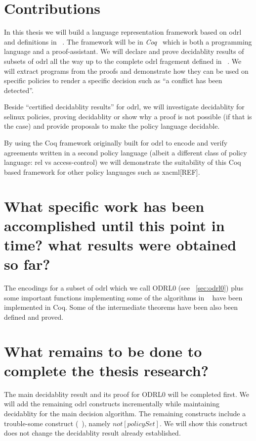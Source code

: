 \section{Contributions}

In this thesis we will build a language representation framework based on \ac{odrl} and definitions in ~\cite{pucella2006}. The framework will be in \emph{Coq}~\cite{coqref} which is both a programming language and a proof-assistant. We will declare and prove decidablity results of subsets of \ac{odrl} all the way up to the complete \ac{odrl} fragement defined in ~\cite{pucella2006}. We will extract programs from the proofs and demonstrate how they can be used on specific policies to render a specific decision such as ``a conflict has been detected''. 

Beside ``certified decidablity results'' for \ac{odrl}, we will investigate decidablity for \ac{selinux} policies, proving decidablity or show why a proof is not possible (if that is the case) and provide proposals to make the policy language decidable.

By using the Coq framework originally built for \ac{odrl} to encode and verify agreements written in a second policy language (albeit a different class of policy language: \ac{rel} vs access-control) we will demonstrate the suitability of this Coq based framework for other policy languages such as \ac{xacml}[REF].

\section{What specific work has been accomplished until this point in time? what results were obtained so far?}

The encodings for a subset of \ac{odrl} which we call ODRL0 (see ~\ref{sec:odrl0}) plus some important functions implementing some of the algorithms in ~\cite{pucella2006} have been implemented in Coq. Some of the intermediate theorems have been also been defined and proved.

\section{What remains to be done to complete the thesis research?}
The main decidablity result and its proof for ODRL0 will be completed first. We will add the remaining \ac{odrl} constructs incrementally while maintaining decidablity for the main decision algorithm. The remaining constructs include a trouble-some construct (~\cite{pucella2006}), namely $not[policySet]$. We will show this construct does not change the decidablity result already established. 

